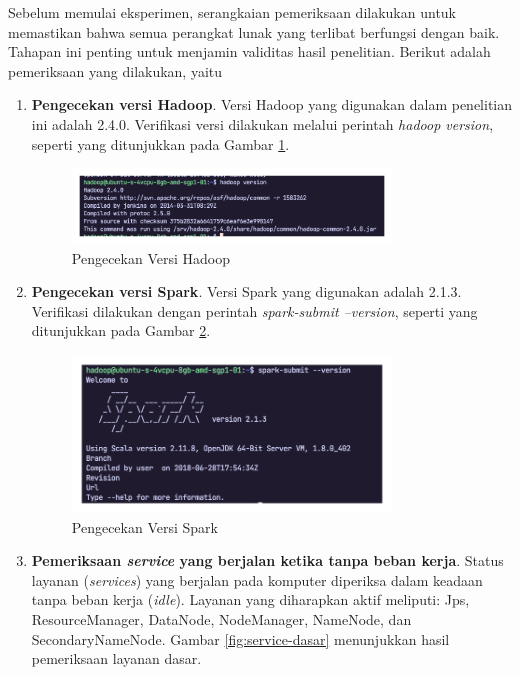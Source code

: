 Sebelum memulai eksperimen, serangkaian pemeriksaan dilakukan untuk memastikan bahwa semua perangkat lunak yang terlibat berfungsi dengan baik. Tahapan ini penting untuk menjamin validitas hasil penelitian. Berikut adalah pemeriksaan yang dilakukan, yaitu
\begin{enumerate}
	\item \textbf{Pengecekan versi Hadoop}. Versi Hadoop yang digunakan dalam penelitian ini adalah 2.4.0. Verifikasi versi dilakukan melalui perintah \textit{hadoop version}, seperti yang ditunjukkan pada Gambar \ref{fig:versi-hadoop}. 
		\begin{figure}[h]
		    \centering
		    \includegraphics[width=0.8\textwidth]{figures/ch04/versi-hadoop}
		    \caption{Pengecekan Versi Hadoop}
		    \label{fig:versi-hadoop}
		\end{figure}
	\item \textbf{Pengecekan versi Spark}. Versi Spark yang digunakan adalah 2.1.3. Verifikasi dilakukan dengan perintah \textit{spark-submit --version}, seperti yang ditunjukkan pada Gambar \ref{fig:versi-spark}.
		\begin{figure}[h]
		    \centering
		    \includegraphics[width=0.8\textwidth]{figures/ch04/versi-spark}
		    \caption{Pengecekan Versi Spark}
		    \label{fig:versi-spark}
		\end{figure}
	\item \textbf{Pemeriksaan \textit{service} yang berjalan ketika tanpa beban kerja}. Status layanan (\textit{services}) yang berjalan pada komputer diperiksa dalam keadaan tanpa beban kerja (\textit{idle}). Layanan yang diharapkan aktif meliputi: Jps, ResourceManager, DataNode, NodeManager, NameNode, dan SecondaryNameNode. Gambar \ref{fig:service-dasar} menunjukkan hasil pemeriksaan layanan dasar.		

\end{enumerate}
